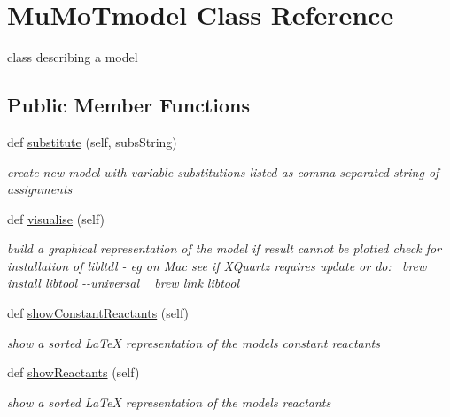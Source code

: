 \hypertarget{class_mu_mo_t_1_1_mu_mo_t_1_1_mu_mo_tmodel}{}\section{Mu\+Mo\+Tmodel Class Reference}
\label{class_mu_mo_t_1_1_mu_mo_t_1_1_mu_mo_tmodel}


class describing a model  


\subsection*{Public Member Functions}
\begin{DoxyCompactItemize}
\item 
def \hyperlink{class_mu_mo_t_1_1_mu_mo_t_1_1_mu_mo_tmodel_a2eec4a3b8deda7c717c06ed89c24d570}{substitute} (self, subs\+String)
\begin{DoxyCompactList}\small\item\em create new model with variable substitutions listed as comma separated string of assignments \end{DoxyCompactList}\item 
def \hyperlink{class_mu_mo_t_1_1_mu_mo_t_1_1_mu_mo_tmodel_affc6fae7ea26f85cde5366af8af85200}{visualise} (self)
\begin{DoxyCompactList}\small\item\em build a graphical representation of the model if result cannot be plotted check for installation of libltdl -\/ eg on Mac see if X\+Quartz requires update or do\+:~\newline
 {\ttfamily brew install libtool -\/-\/universal} ~\newline
 {\ttfamily brew link libtool} \end{DoxyCompactList}\item 
def \hyperlink{class_mu_mo_t_1_1_mu_mo_t_1_1_mu_mo_tmodel_a824eaf8994c839c0a9f17539f298974f}{show\+Constant\+Reactants} (self)
\begin{DoxyCompactList}\small\item\em show a sorted La\+TeX representation of the model\textquotesingle{}s constant reactants \end{DoxyCompactList}\item 
def \hyperlink{class_mu_mo_t_1_1_mu_mo_t_1_1_mu_mo_tmodel_a2feaf6de25201c1e6503cd2ed131a1f2}{show\+Reactants} (self)
\begin{DoxyCompactList}\small\item\em show a sorted La\+TeX representation of the model\textquotesingle{}s reactants \end{DoxyCompactList}\item 

\end{DoxyCompactItemize}
